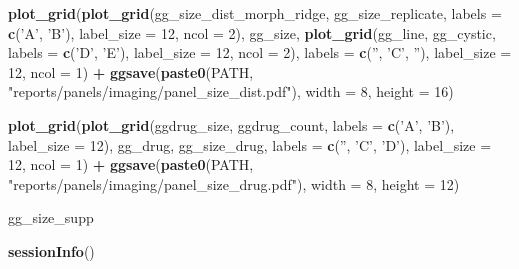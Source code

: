 \documentclass[
]{article}
\newenvironment{Shaded}{\begin{snugshade}}{\end{snugshade}}
\newcommand{\DataTypeTok}[1]{\textcolor[rgb]{0.13,0.29,0.53}{#1}}
\newcommand{\DecValTok}[1]{\textcolor[rgb]{0.00,0.00,0.81}{#1}}
\newcommand{\KeywordTok}[1]{\textcolor[rgb]{0.13,0.29,0.53}{\textbf{#1}}}
\newcommand{\NormalTok}[1]{#1}
\newcommand{\OperatorTok}[1]{\textcolor[rgb]{0.81,0.36,0.00}{\textbf{#1}}}
\newcommand{\StringTok}[1]{\textcolor[rgb]{0.31,0.60,0.02}{#1}}
\begin{document}
\begin{Shaded}
\begin{Highlighting}[]
\KeywordTok{plot_grid}\NormalTok{(}\KeywordTok{plot_grid}\NormalTok{(gg_size_dist_morph_ridge, gg_size_replicate, }\DataTypeTok{labels =} \KeywordTok{c}\NormalTok{(}\StringTok{'A'}\NormalTok{, }\StringTok{'B'}\NormalTok{), }\DataTypeTok{label_size =} \DecValTok{12}\NormalTok{, }\DataTypeTok{ncol =} \DecValTok{2}\NormalTok{),}
\NormalTok{          gg_size,}
          \KeywordTok{plot_grid}\NormalTok{(gg_line, gg_cystic, }\DataTypeTok{labels =} \KeywordTok{c}\NormalTok{(}\StringTok{'D'}\NormalTok{, }\StringTok{'E'}\NormalTok{), }\DataTypeTok{label_size =} \DecValTok{12}\NormalTok{, }\DataTypeTok{ncol =} \DecValTok{2}\NormalTok{),}
          \DataTypeTok{labels =} \KeywordTok{c}\NormalTok{(}\StringTok{''}\NormalTok{, }\StringTok{'C'}\NormalTok{, }\StringTok{''}\NormalTok{), }\DataTypeTok{label_size =} \DecValTok{12}\NormalTok{, }\DataTypeTok{ncol =} \DecValTok{1}\NormalTok{) }\OperatorTok{+}
\StringTok{  }\KeywordTok{ggsave}\NormalTok{(}\KeywordTok{paste0}\NormalTok{(PATH, }\StringTok{"reports/panels/imaging/panel_size_dist.pdf"}\NormalTok{), }\DataTypeTok{width =} \DecValTok{8}\NormalTok{, }\DataTypeTok{height =} \DecValTok{16}\NormalTok{)}

\KeywordTok{plot_grid}\NormalTok{(}\KeywordTok{plot_grid}\NormalTok{(ggdrug_size, ggdrug_count, }\DataTypeTok{labels =} \KeywordTok{c}\NormalTok{(}\StringTok{'A'}\NormalTok{, }\StringTok{'B'}\NormalTok{), }\DataTypeTok{label_size =} \DecValTok{12}\NormalTok{),}
\NormalTok{          gg_drug,}
\NormalTok{          gg_size_drug,}
          \DataTypeTok{labels =} \KeywordTok{c}\NormalTok{(}\StringTok{''}\NormalTok{, }\StringTok{'C'}\NormalTok{, }\StringTok{'D'}\NormalTok{), }\DataTypeTok{label_size =} \DecValTok{12}\NormalTok{, }\DataTypeTok{ncol =} \DecValTok{1}\NormalTok{) }\OperatorTok{+}
\StringTok{  }\KeywordTok{ggsave}\NormalTok{(}\KeywordTok{paste0}\NormalTok{(PATH, }\StringTok{"reports/panels/imaging/panel_size_drug.pdf"}\NormalTok{), }\DataTypeTok{width =} \DecValTok{8}\NormalTok{, }\DataTypeTok{height =} \DecValTok{12}\NormalTok{)}

\NormalTok{gg_size_supp}
\end{Highlighting}
\end{Shaded}

\begin{Shaded}
\begin{Highlighting}[]
\KeywordTok{sessionInfo}\NormalTok{()}
\end{Highlighting}
\end{Shaded}
\end{document}
